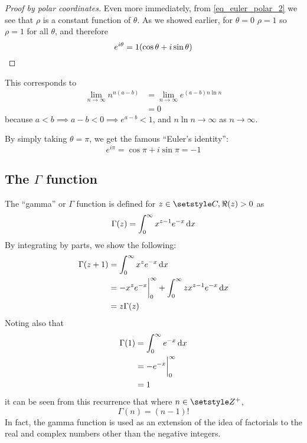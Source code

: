 \begin{proof}[Proof by polar coordinates]
 Even more immediately, from \ref{eq_euler_polar_2} we see that \(\rho\) is a
 constant function of \(\theta\). As we showed earlier, for \(\theta = 0\)
 \(\rho = 1\) so \(\rho = 1\) for all \(\theta\), and therefore
 \begin{equation*}
  e^{i \theta} = 1 (\cos \theta + i \sin \theta) \qedhere
 \end{equation*}
\end{proof}

\begin{lemma}
 \label{lem_nn_exp_limit}
 This corresponds to
 \begin{align*}
  \lim_{n \to \infty} n^{n(a - b)}
   &= \lim_{n \to \infty} e^{(a - b)n \ln n} \\
   &= 0
 \end{align*}
 because \(a < b \implies a - b < 0 \implies e^{a - b} < 1\), and
 \(n \ln n \to \infty\) as \(n \to \infty\).
\end{lemma}

\begin{corollary}
 By simply taking \(\theta = \pi\), we get the famous ``Euler's identity'':
 \begin{equation*}
  e^{i \pi} = \cos \pi + i \sin \pi = -1
 \end{equation*}
\end{corollary}

\subsection[The \texorpdfstring{\(\Gamma\)}{Gamma} function]
           {The \boldmath\(\Gamma\) function}

The ``gamma'' or \(\Gamma\) function is defined for
\(z \in \Complex, \Re(z) > 0\) as
\begin{equation*}
 \Gamma(z) = \integ[0]<\infty>{x^{z - 1}e^{-x}}{x}
\end{equation*}
By integrating by parts, we show the following:
\begin{align*}
 \Gamma(z + 1) &= \integ[0]<\infty>{x^z e^{-x}}{x} \\
           &= -x^z e^{-x}\eval_0^\infty
              + \integ[0]<\infty>{zx^{z - 1}e^{-x}}{x} \\
           &= z\Gamma(z)
\end{align*}
Noting also that
\begin{align*}
 \Gamma(1) &= \integ[0]<\infty>{e^{-x}}{x} \\
       &= -e^{-x}\eval_0^\infty \\
       &= 1
\end{align*}
it can be seen from this recurrence that where \(n \in \Integers^+\),
\begin{equation*}
 \Gamma(n) = (n - 1)!
\end{equation*}
In fact, the gamma function is used as an extension of the idea of
factorials to the real and complex numbers other than the negative integers.

